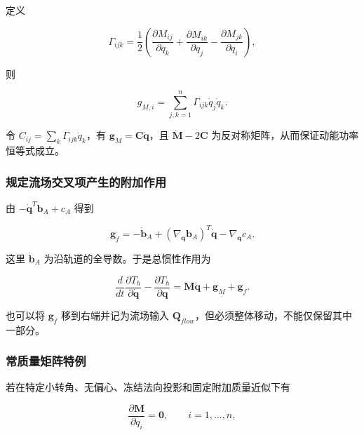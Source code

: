 定义

\begin{equation}
\label{eq:galerkin-2-87}
\Gamma_{ijk} = \frac{1}{2}\left( \frac{\partial M_{ij}}{\partial q_{k}} + \frac{\partial M_{ik}}{\partial q_{j}} - \frac{\partial M_{jk}}{\partial q_{i}} \right),
\end{equation}

则

\begin{equation}
\label{eq:galerkin-2-88}
g_{M,i} = \sum_{j,k = 1}^{n}\Gamma_{ijk}{\dot{q}}_{j}{\dot{q}}_{k}.
\end{equation}

令 \(C_{ij} = \sum_{k}^{}\Gamma_{ijk}{\dot{q}}_{k}\)，有 \(\mathbf{g}_{M} = \mathbf{C}\dot{\mathbf{q}}\)，且 \(\dot{\mathbf{M}} - 2\mathbf{C}\) 为反对称矩阵，从而保证动能功率恒等式成立。

\subsubsection{规定流场交叉项产生的附加作用}\label{sec:galerkin-2-6-3}

由 \(- {\dot{\mathbf{q}}}^{T}\mathbf{b}_{A} + c_{A}\) 得到

\begin{equation}
\label{eq:galerkin-2-89}
\boxed{\mathbf{g}_{f} = - {\dot{\mathbf{b}}}_{A} + \left( \nabla_{\mathbf{q}}\mathbf{b}_{A} \right)^{T}\dot{\mathbf{q}} - \nabla_{\mathbf{q}}c_{A}.}
\end{equation}

这里 \({\dot{\mathbf{b}}}_{A}\) 为沿轨道的全导数。于是总惯性作用为

\begin{equation}
\label{eq:galerkin-2-90}
\boxed{\frac{d}{dt}\frac{\partial T_{h}}{\partial\dot{\mathbf{q}}} - \frac{\partial T_{h}}{\partial\mathbf{q}} = \mathbf{M}\ddot{\mathbf{q}} + \mathbf{g}_{M} + \mathbf{g}_{f}.}
\end{equation}

也可以将 \(\mathbf{g}_{f}\) 移到右端并记为流场输入 \(\mathbf{Q}_{flow}\)，但必须整体移动，不能仅保留其中一部分。

\subsubsection{常质量矩阵特例}\label{sec:galerkin-2-6-4}

若在特定小转角、无偏心、冻结法向投影和固定附加质量近似下有

\begin{equation}
\label{eq:galerkin-2-91}
\frac{\partial\mathbf{M}}{\partial q_{i}} = \mathbf{0},\quad\quad i = 1,\ldots,n,
\end{equation}

